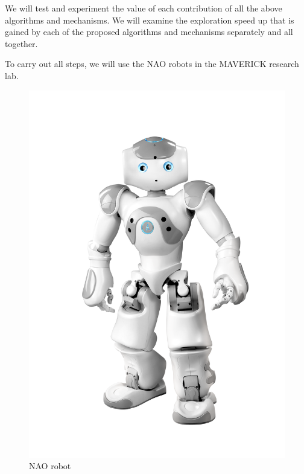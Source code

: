 \documentclass[a4paper,10pt]{article}
\begin{document}
We will test and experiment the value of each contribution of all the above
algorithms and mechanisms. We will examine the exploration speed up that is
gained by each of the proposed algorithms and mechanisms separately and all
together. 

To carry out all steps, we will use the NAO robots
in the MAVERICK research lab.
 
\begin{figure}[htb]
 \centering
 \includegraphics[width=0.5\columnwidth,keepaspectratio]{images/NAO-4_stand.png}
 \caption{NAO robot}
 \label{fig:NaoRobot}
\end{figure}



\end{document}
